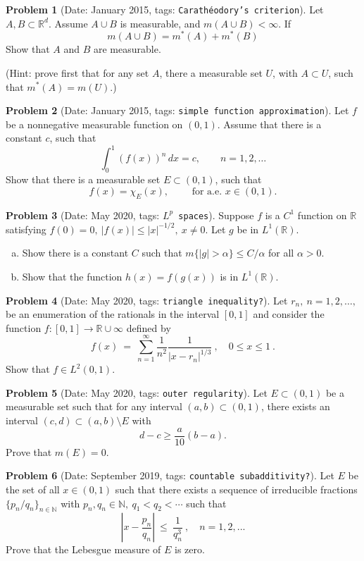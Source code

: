\documentclass[11pt, notitlepage]{article}
\theoremstyle{definition}
\theoremstyle{definition}
\theoremstyle{definition}
\newtheorem{probstate}{Problem}
\theoremstyle{remark}
\newenvironment{problem}[2]{
    \begin{probstate}[Date: #1, tags: \texttt{#2}]
}
{
  \end{probstate}
}
\begin{document}
\begin{problem}{January 2015}{Carath\'eodory's criterion}
Let $A, B\subset \mathbb R^d$. Assume $A\cup B$ is measurable, and $m(A\cup B)<\infty$. If
$$m(A\cup B)=m^*(A)+m^*(B)$$
Show that $A$ and $B$ are measurable.

(Hint: prove first that for any set $A$, there a measurable set $U$, with $A\subset U$, such that $m^*(A)=m(U)$.)
\end{problem}

\begin{problem}{January 2015}{simple function approximation}
Let $f$ be a nonnegative measurable function on $(0,1)$. Assume that there is a constant $c$, such that
$$\int_0^1 (f(x))^n\,dx=c,\qquad n=1,2,\dots$$
Show that there is a measurable set $E\subset (0,1)$, such that
$$f(x)=\chi_E(x),\qquad \text{ for a.e. }  x\in(0,1).$$
\end{problem}

\begin{problem}{May 2020}{$L^p$ spaces}
Suppose $f$ is a $C^1$ function on $\mathbb{R}$ satisfying $f(0)=0, \ |f(x)|\le |x|^{-1/2}, \ x\ne 0$. Let $g$ be in  $L^1(\mathbb{R})$.
\begin{enumerate}[(a)]
\item Show there is a constant $C$ such that $m\{|g|>\alpha\}\le C/\alpha$ for all $\alpha>0$.
\item Show that the function $h(x)=f(g(x))$ is in $L^1(\mathbb{R})$.
\end{enumerate}
\end{problem}

\begin{problem}{May 2020}{triangle inequality?}
  Let $r_n, \ n=1,2,\ldots,$ be an enumeration of the rationals in the interval $[0,1]$ and consider the function  $f:[0,1]\to\mathbb{R}\cup{\infty}$ defined by
$$
f(x) \ = \ \sum_{n=1}^\infty \frac{1}{n^2}\frac{1}{|x-r_n|^{1/3}} \ , \quad 0\le x\le 1 \ .
$$
Show that $f\in L^2(0,1)$.
\end{problem}

\begin{problem}{May 2020}{outer regularity}
  Let $E \subset (0,1)$ be a measurable set such that for any interval $(a,b) \subset (0,1)$, there exists an interval $(c,d) \subset (a,b) \setminus E$ with
 \[
  d-c \ge \frac{a}{10} (b-a).
 \]
 Prove that $m(E)=0$.

\end{problem}

\begin{problem}{September 2019}{countable subadditivity?}
  Let $E$ be the set of all $x\in(0,1)$ such that there exists  a sequence of irreducible fractions
$\{p_n/q_n\}_{n\in\mathbb{N}}$ with $p_n,q_n\in\mathbb{N}, \ q_1<q_2<\cdots$ such that
$$
\left|x-\frac{p_n}{q_n}\right| \ \le \ \frac{1}{q_n^3} \ , \quad n=1,2,...
$$
Prove that the Lebesgue measure of $E$ is zero.
\end{problem}
\end{document}
